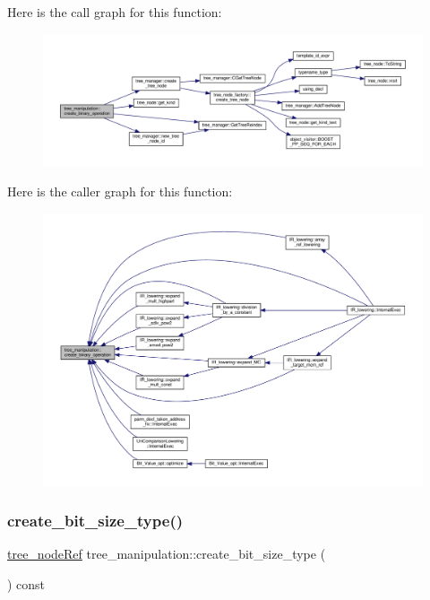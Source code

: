 Here is the call graph for this function\+:
\nopagebreak
\begin{figure}[H]
\begin{center}
\leavevmode
\includegraphics[width=350pt]{d0/d99/classtree__manipulation_a69dbd230e26dc9f0677f16c57defe666_cgraph}
\end{center}
\end{figure}
Here is the caller graph for this function\+:
\nopagebreak
\begin{figure}[H]
\begin{center}
\leavevmode
\includegraphics[width=350pt]{d0/d99/classtree__manipulation_a69dbd230e26dc9f0677f16c57defe666_icgraph}
\end{center}
\end{figure}
\mbox{\label{classtree__manipulation_a33b3d06e9207b3d28daf9807a6549d2f}} 
\subsubsection{\texorpdfstring{create\+\_\+bit\+\_\+size\+\_\+type()}{create\_bit\_size\_type()}}
{\footnotesize\ttfamily \hyperlink{tree__node_8hpp_a6ee377554d1c4871ad66a337eaa67fd5}{tree\+\_\+node\+Ref} tree\+\_\+manipulation\+::create\+\_\+bit\+\_\+size\+\_\+type (\begin{DoxyParamCaption}{ }\end{DoxyParamCaption}) const}




